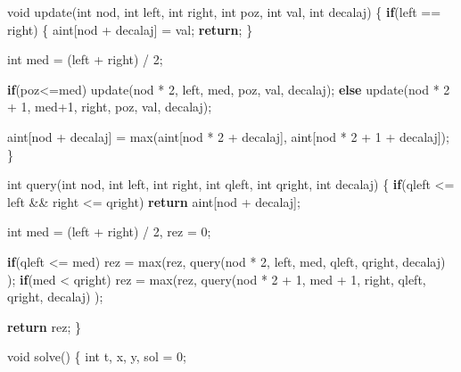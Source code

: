 \documentclass[10pt,]{article}
\newenvironment{Shaded}{}{}
\newcommand{\KeywordTok}[1]{\textcolor[rgb]{0.00,0.44,0.13}{\textbf{{#1}}}}
\newcommand{\DataTypeTok}[1]{\textcolor[rgb]{0.56,0.13,0.00}{{#1}}}
\newcommand{\DecValTok}[1]{\textcolor[rgb]{0.25,0.63,0.44}{{#1}}}
\newcommand{\NormalTok}[1]{{#1}}
\begin{document}
\begin{Shaded}
\begin{Highlighting}[]
{{{{\DataTypeTok{void} \NormalTok{update(}\DataTypeTok{int} \NormalTok{nod, }\DataTypeTok{int} \NormalTok{left, }\DataTypeTok{int} \NormalTok{right, }\DataTypeTok{int} \NormalTok{poz, }\DataTypeTok{int} \NormalTok{val, }\DataTypeTok{int} \NormalTok{decalaj)}
\NormalTok{\{}
  \KeywordTok{if}\NormalTok{(left == right) \{}
    \NormalTok{aint[nod + decalaj] = val;}
    \KeywordTok{return}\NormalTok{;}
  \NormalTok{\}}

  \DataTypeTok{int} \NormalTok{med = (left + right) / }\DecValTok{2}\NormalTok{;}

  \KeywordTok{if}\NormalTok{(poz<=med)}
    \NormalTok{update(nod * }\DecValTok{2}\NormalTok{, left, med, poz, val, decalaj);}
  \KeywordTok{else}
    \NormalTok{update(nod * }\DecValTok{2} \NormalTok{+ }\DecValTok{1}\NormalTok{, med}\DecValTok{+1}\NormalTok{, right, poz, val, decalaj);}

  \NormalTok{aint[nod + decalaj] = max(aint[nod * }\DecValTok{2} \NormalTok{+ decalaj], aint[nod * }\DecValTok{2} \NormalTok{+ }\DecValTok{1} \NormalTok{+ decalaj]);}
\NormalTok{\}}

\DataTypeTok{int} \NormalTok{query(}\DataTypeTok{int} \NormalTok{nod, }\DataTypeTok{int} \NormalTok{left, }\DataTypeTok{int} \NormalTok{right, }\DataTypeTok{int} \NormalTok{qleft, }\DataTypeTok{int} \NormalTok{qright, }\DataTypeTok{int} \NormalTok{decalaj)}
\NormalTok{\{}
  \KeywordTok{if}\NormalTok{(qleft <= left && right <= qright)}
    \KeywordTok{return} \NormalTok{aint[nod + decalaj];}

  \DataTypeTok{int} \NormalTok{med = (left + right) / }\DecValTok{2}\NormalTok{, rez = }\DecValTok{0}\NormalTok{;}

  \KeywordTok{if}\NormalTok{(qleft <= med)}
    \NormalTok{rez = max(rez, query(nod * }\DecValTok{2}\NormalTok{, left, med, qleft, qright, decalaj) );}
  \KeywordTok{if}\NormalTok{(med < qright)}
    \NormalTok{rez = max(rez, query(nod * }\DecValTok{2} \NormalTok{+ }\DecValTok{1}\NormalTok{, med + }\DecValTok{1}\NormalTok{, right, qleft, qright, decalaj) );}

  \KeywordTok{return} \NormalTok{rez;}
\NormalTok{\}}

\DataTypeTok{void} \NormalTok{solve()}
\NormalTok{\{}
  \DataTypeTok{int} \NormalTok{t, x, y, sol = }\DecValTok{0}\NormalTok{;}

}}}}
\end{Highlighting}
\end{Shaded}
\end{document}
